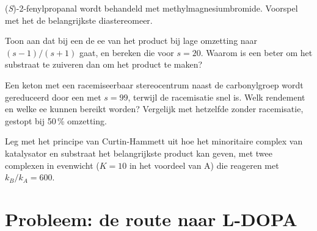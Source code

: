 \begin{exercise}[$\star\star$]\label{exo:b3:asymmetric-synthesis:9}
(\textit{S})-2-fenylpropanal wordt behandeld met methylmagnesiumbromide. Voorspel met het
 de belangrijkste diastereomeer.
\end{exercise}

\begin{exercise}[$\star\star\star$]\label{exo:b3:asymmetric-synthesis:10}
Toon aan dat bij een  de ee van het product bij lage omzetting naar $(s - 1)/(s + 1)$
gaat, en bereken die voor $s = 20$. Waarom is een  beter om het substraat te zuiveren dan om het product
te maken?
\end{exercise}

\begin{exercise}[$\star\star\star$]\label{exo:b3:asymmetric-synthesis:11}
Een keton met een racemiseerbaar stereocentrum naast de carbonylgroep
wordt gereduceerd door een  met $s = 99$, terwijl de racemisatie snel is. Welk
rendement en welke ee kunnen bereikt worden? Vergelijk met hetzelfde
 zonder racemisatie, gestopt bij 50\,\% omzetting.
\end{exercise}

\begin{exercise}[$\star\star\star$]\label{exo:b3:asymmetric-synthesis:12}
Leg met het principe van Curtin-Hammett uit hoe het minoritaire complex
van katalysator en substraat het belangrijkste product kan geven, met
twee complexen in evenwicht
($K = 10$ in het voordeel van A) die reageren met $k_B/k_A = 600$.
\end{exercise}

\section{Probleem: de route naar L-DOPA}

